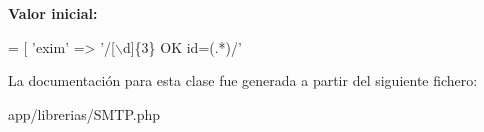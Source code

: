 {\bfseries Valor inicial\+:}
\begin{DoxyCode}
= [
        \textcolor{stringliteral}{'exim'} => \textcolor{stringliteral}{'/[\(\backslash\)d]\{3\} OK id=(.*)/'}
\end{DoxyCode}


La documentación para esta clase fue generada a partir del siguiente fichero\+:\begin{DoxyCompactItemize}
\item 
app/librerias/S\+M\+T\+P.\+php\end{DoxyCompactItemize}
